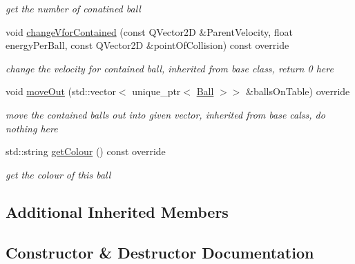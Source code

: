 \begin{DoxyCompactItemize}
\begin{DoxyCompactList}\small\item\em get the number of conatined ball \end{DoxyCompactList}\item 
void \mbox{\hyperlink{class_simple_ball_a5e100bd3bc3b700d3ce1c5028d95ac31}{change\+Vfor\+Contained}} (const Q\+Vector2D \&Parent\+Velocity, float energy\+Per\+Ball, const Q\+Vector2D \&point\+Of\+Collision) const override
\begin{DoxyCompactList}\small\item\em change the velocity for contained ball, inherited from base class, return 0 here \end{DoxyCompactList}\item 
void \mbox{\hyperlink{class_simple_ball_a1af03353f6c3414e6ce7c12a9b338e72}{move\+Out}} (std\+::vector$<$ unique\+\_\+ptr$<$ \mbox{\hyperlink{class_ball}{Ball}} $>$$>$ \&balls\+On\+Table) override
\begin{DoxyCompactList}\small\item\em move the contained balls out into given vector, inherited from base calss, do nothing here \end{DoxyCompactList}\item 
std\+::string \mbox{\hyperlink{class_simple_ball_aad4437558814bc8c6f276d5e09507eb4}{get\+Colour}} () const override
\begin{DoxyCompactList}\small\item\em get the colour of this ball \end{DoxyCompactList}\end{DoxyCompactItemize}
\subsection*{Additional Inherited Members}


\subsection{Constructor \& Destructor Documentation}
\mbox{\label{class_simple_ball_a73986d31758ab1201000aef11bef49aa}} 
